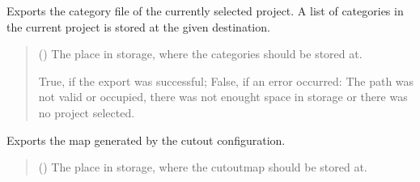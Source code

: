 \documentclass[letterpaper,10pt,english]{sphinxmanual}
\begin{document}
\begin{fulllineitems}
\begin{fulllineitems}
\label{\detokenize{apidoc/src.osm_configurator.control:src.osm_configurator.control.export_controller.ExportController.export_configurations}}
\pysigstartsignatures
{}
\pysigstopsignatures
\sphinxAtStartPar
Exports the category file of the currently selected project.
A list of categories in the current project is stored at the given destination.
\begin{quote}\begin{description}
\sphinxAtStartPar
{} () \textendash{} The place in storage, where the categories should be stored at.

\sphinxAtStartPar
True, if the export was successful; False, if an error occurred: The path was not valid or occupied, there was not enought space in storage or there was no project selected.

\sphinxAtStartPar
{}

\end{description}\end{quote}

\end{fulllineitems}


\begin{fulllineitems}
\label{\detokenize{apidoc/src.osm_configurator.control:src.osm_configurator.control.export_controller.ExportController.export_cut_out_map}}
\pysigstartsignatures
{}
\pysigstopsignatures
\sphinxAtStartPar
Exports the map generated by the cut\sphinxhyphen{}out configuration.
\begin{quote}\begin{description}
\sphinxAtStartPar
{} () \textendash{} The place in storage, where the cut\sphinxhyphen{}out\sphinxhyphen{}map should be stored at.


\end{description}
\end{quote}
\end{fulllineitems}
\end{fulllineitems}
\end{document}
